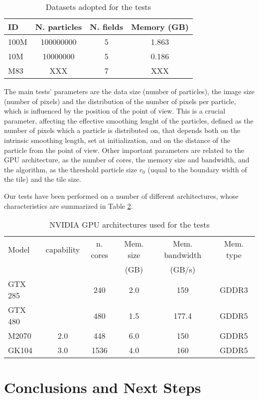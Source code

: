 \documentclass[11pt]{article}
\begin{document}
\begin{table}
\caption{Datasets adopted for the tests}
\centering 
\begin{tabular}{l c c c} 
\hline\hline 
ID & N. particles & N. fields & Memory (GB) \\ [0.5ex] 
\hline %
100M   & 100000000 & 5 & 1.863 \\ 
10M    & 10000000  & 5 & 0.186 \\
M83    & XXX & 7 & XXX \\
\hline 
\end{tabular}
\label{table:tests}
\end{table}

The main tests' parameters are the data size (number of particles),
the image size (number of pixels) and the distribution of the number of pixels 
per particle, which is influenced by the position of the point of view.
This is a crucial parameter, affecting the effective smoothing lenght of the particles,
defined as the number of pixels which a particle is distributed on, that 
depends both on the intrinsic smoothing length, set at initialization, and 
on the distance of the particle from the point of view. Other important parameters
are related to the GPU architecture, as the number of cores, the memory size and bandwidth, and the algorithm, as the threshold particle size $r_0$ (uqual to the boundary width of the tile) and the tile size.

Our tests have been performed on a number of different architectures, 
whose characteristics are summarized in Table \ref{table:gpus}. 

\begin{table}
\caption{NVIDIA GPU architectures used for the tests}
\centering
\begin{tabular}{l c c c c c}
\hline\hline
Model   & capability & n. cores & Mem. size & Mem. bandwidth & Mem. type  \\ [0.5ex]
        &      &    & (GB)      & (GB/s)  & \\
\hline %
GTX 285 &  & 240   & 2.0 & 159   & GDDR3 \\
GTX 480 &  & 480   & 1.5 & 177.4 & GDDR5 \\
M2070   & 2.0 & 448   & 6.0 & 150   & GDDR5 \\
GK104   & 3.0 & 1536  & 4.0 & 160   & GDDR5 \\
\hline
\end{tabular}
\label{table:gpus}
\end{table}
 


\section{Conclusions and Next Steps}
\end{document}
